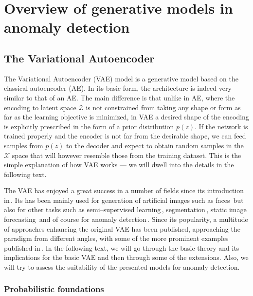 \chapter{Overview of generative models in anomaly detection}

\section{The Variational Autoencoder}

The Variational Autoencoder (VAE) model is a generative model based
on the classical autoencoder (AE). In its basic form, the architecture
is indeed very similar to that of an AE. The main difference is that
unlike in AE, where the encoding to latent space $\mathcal{Z}$ is
not constrained from taking any shape or form as far as the learning
objective is minimized, in VAE a desired shape of the encoding is
explicitly prescribed in the form of a prior distribution $p(z)$.
If the network is trained properly and the encoder is not far from
the desirable shape, we can feed samples from $p(z)$ to the decoder
and expect to obtain random samples in the $\mathcal{X}$ space that
will however resemble those from the training dataset. This is the
simple explanation of how VAE works --- we will dwell into the details
in the following text.

The VAE has enjoyed a great success in a number of fields since its
introduction in\,\cite{kingma2013vae}. Its has been mainly used
for generation of artificial images such as faces\,\cite{rezende2014stochastic}
but also for other tasks such as semi--supervised learning\,\cite{kingma2014semi},
segmentation\,\cite{sohn2015learning}, static image forecasting\,\cite{walker2016uncertain}
and of course for anomaly detection\,\cite{an2015variational,xu2018unsupervised,solch2016variational}.
Since its popularity, a multitude of approaches enhancing the original
VAE has been published, approaching the paradigm from different angles,
with some of the more prominent examples published in\,\cite{higgins2017beta,zhao2017infovae,tolstikhin2017wasserstein,makhzani2015adversarial,pu2017adversarial}.
In the following text, we will go through the basic theory and its
implications for the basic VAE and then through some of the extensions.
Also, we will try to assess the suitability of the presented models
for anomaly detection.

\subsection{Probabilistic foundations}


